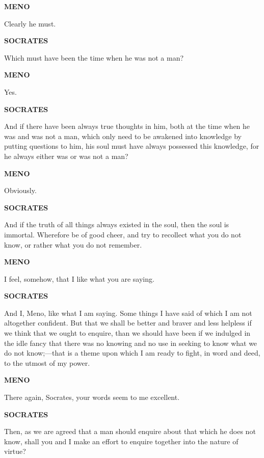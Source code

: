 \documentclass[11pt,letter]{article}
\begin{document}
\par \textbf{MENO}
\par   Clearly he must.

\par \textbf{SOCRATES}
\par   Which must have been the time when he was not a man?

\par \textbf{MENO}
\par   Yes.

\par \textbf{SOCRATES}
\par   And if there have been always true thoughts in him, both at the time when he was and was not a man, which only need to be awakened into knowledge by putting questions to him, his soul must have always possessed this knowledge, for he always either was or was not a man?

\par \textbf{MENO}
\par   Obviously.

\par \textbf{SOCRATES}
\par   And if the truth of all things always existed in the soul, then the soul is immortal. Wherefore be of good cheer, and try to recollect what you do not know, or rather what you do not remember.

\par \textbf{MENO}
\par   I feel, somehow, that I like what you are saying.

\par \textbf{SOCRATES}
\par   And I, Meno, like what I am saying. Some things I have said of which I am not altogether confident. But that we shall be better and braver and less helpless if we think that we ought to enquire, than we should have been if we indulged in the idle fancy that there was no knowing and no use in seeking to know what we do not know;—that is a theme upon which I am ready to fight, in word and deed, to the utmost of my power.

\par \textbf{MENO}
\par   There again, Socrates, your words seem to me excellent.

\par \textbf{SOCRATES}
\par   Then, as we are agreed that a man should enquire about that which he does not know, shall you and I make an effort to enquire together into the nature of virtue?
\end{document}
